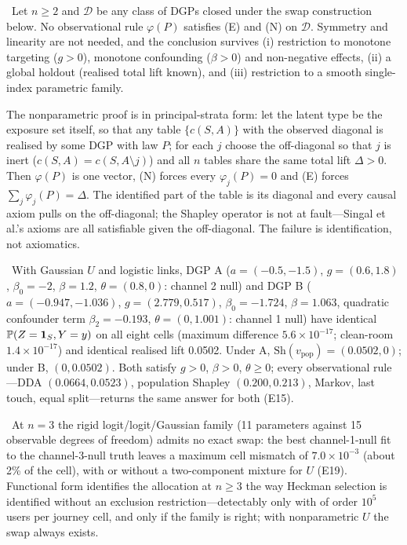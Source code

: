 \begin{theorem}
\label{attr:thm:impossible}
\tagEstablished\ Let $n \ge 2$ and $\mathcal D$ be any class of DGPs closed under the swap construction below. No observational rule $\varphi(P)$ satisfies (E) and (N) on $\mathcal D$. Symmetry and linearity are not needed, and the conclusion survives (i) restriction to monotone targeting ($g > 0$), monotone confounding ($\beta > 0$) and non-negative effects, (ii) a global holdout (realised total lift known), and (iii) restriction to a smooth single-index parametric family.
\end{theorem}

The nonparametric proof is in principal-strata form: let the latent type be the exposure set itself, so that any table $\{c(S,A)\}$ with the observed diagonal is realised by some DGP with law $P$; for each $j$ choose the off-diagonal so that $j$ is inert ($c(S,A) = c(S, A \setminus j)$) and all $n$ tables share the same total lift $\Delta > 0$. Then $\varphi(P)$ is one vector, (N) forces every $\varphi_j(P) = 0$ and (E) forces $\sum_j \varphi_j(P) = \Delta$. The identified part of the table is its diagonal and every causal axiom pulls on the off-diagonal; the Shapley operator is not at fault---Singal et al.'s axioms are all satisfiable given the off-diagonal. The failure is identification, not axiomatics.

\begin{proposition}[Exact swap inside a smooth family, $n = 2$]
\label{attr:prop:swap}
\tagEstablished\ With Gaussian $U$ and logistic links, DGP A ($a = (-0.5, -1.5)$, $g = (0.6, 1.8)$, $\beta_0 = -2$, $\beta = 1.2$, $\theta = (0.8, 0)$: channel 2 null) and DGP B ($a = (-0.947, -1.036)$, $g = (2.779, 0.517)$, $\beta_0 = -1.724$, $\beta = 1.063$, quadratic confounder term $\beta_2 = -0.193$, $\theta = (0, 1.001)$: channel 1 null) have identical $\mathbb{P}(Z = \mathbf{1}_S, Y = y)$ on all eight cells (maximum difference $5.6\times10^{-17}$; clean-room $1.4\times10^{-17}$) and identical realised lift 0.0502. Under A, $\mathrm{Sh}(v_{\mathrm{pop}}) = (0.0502, 0)$; under B, $(0, 0.0502)$. Both satisfy $g > 0$, $\beta > 0$, $\theta \ge 0$; every observational rule---DDA $(0.0664, 0.0523)$, population Shapley $(0.200, 0.213)$, Markov, last touch, equal split---returns the same answer for both (E15).
\end{proposition}

\begin{remark}
\label{attr:rem:boundary}
\tagNumerical\ At $n = 3$ the rigid logit/logit/Gaussian family (11 parameters against 15 observable degrees of freedom) admits no exact swap: the best channel-1-null fit to the channel-3-null truth leaves a maximum cell mismatch of $7.0\times10^{-3}$ (about 2\% of the cell), with or without a two-component mixture for $U$ (E19). Functional form identifies the allocation at $n \ge 3$ the way Heckman selection is identified without an exclusion restriction---detectably only with of order $10^5$ users per journey cell, and only if the family is right; with nonparametric $U$ the swap always exists.
\end{remark}

